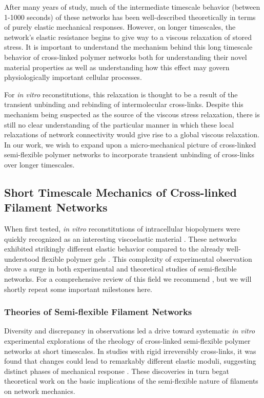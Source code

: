 \documentclass[pre,reprint]{revtex4-1}
\begin{document}
After many years of study, much of the intermediate timescale behavior (between 1-1000 seconds) of these networks has been well-described theoretically in terms of purely elastic mechanical responses.  However, on longer timescales, the network's elastic resistance begins to give way to a viscous relaxation of stored stress.   It is important to understand the mechanism behind this long timescale behavior of cross-linked polymer networks both for understanding their novel material properties as well as understanding how this effect may govern physiologically important cellular processes\cite{cell_rheo}.

For {\em in vitro} reconstitutions, this relaxation is thought to be a result of the transient unbinding and rebinding of intermolecular cross-links\cite{rheo_crosslinksmatter,theo_crosslinkslip1}. Despite this mechanism being suspected as the source of the viscous stress relaxation, there is still no clear understanding of the particular manner in which these local relaxations of network connectivity would give rise to a global viscous relaxation.  In our work, we wish to expand upon a micro-mechanical picture of cross-linked semi-flexible polymer networks to incorporate transient unbinding of cross-links over longer timescales.  


\subsection{Short Timescale Mechanics of Cross-linked Filament Networks}

When first tested, {\em in vitro} reconstitutions of intracellular biopolymers were quickly recognized as an interesting viscoelastic material \cite{rheo_actingel}.  These networks exhibited strikingly different elastic behavior compared to the already well-understood flexible polymer gels \cite{rheo_bench}.  This complexity of experimental observation drove a surge in both experimental and theoretical studies of semi-flexible networks.  For a comprehensive review of this field we recommend \cite{megareview}, but we will shortly repeat some important milestones here.

\subsubsection{Theories of Semi-flexible Filament Networks}
 
Diversity and discrepancy in observations led a drive toward systematic {\em in vitro} experimental explorations of the rheology of cross-linked semi-flexible polymer networks at short timescales.  In studies with rigid irreversibly cross-links, it was found that changes could lead to remarkably different elastic moduli, suggesting distinct phases of mechanical response \cite{rheo_marge}.  These discoveries in turn begat theoretical work on the basic implications of the semi-flexible nature of filaments on network mechanics.  
\end{document}
